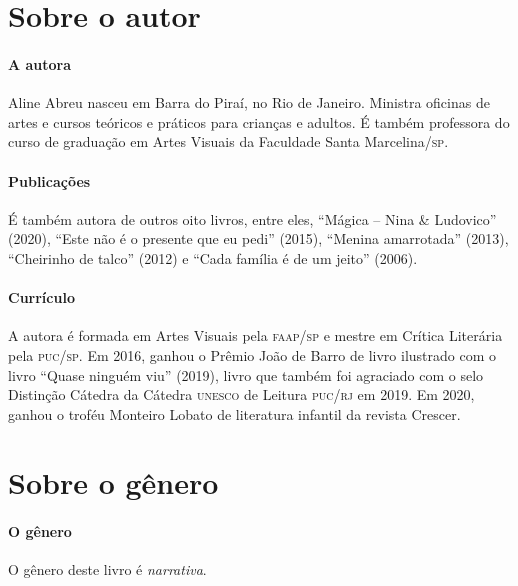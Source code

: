 \documentclass[11pt]{extarticle}
\begin{document}
\section{Sobre o autor}

\paragraph{A autora} 
Aline Abreu nasceu em Barra do Piraí, no Rio de Janeiro. Ministra oficinas de artes e cursos teóricos e práticos para crianças e adultos. É também professora do curso de graduação em Artes Visuais da Faculdade Santa Marcelina/\textsc{sp}.

\paragraph{Publicações} 
É também autora de outros oito livros, entre eles, ``Mágica – Nina \& Ludovico'' (2020), ``Este não é o presente que eu pedi'' (2015), ``Menina amarrotada'' (2013), ``Cheirinho de talco'' (2012) e ``Cada família é de um jeito'' (2006).

\paragraph{Currículo} 
A autora é formada em Artes Visuais pela \textsc{faap/sp} e mestre em Crítica Literária pela \textsc{puc/sp}. 
Em 2016, ganhou o Prêmio João de Barro de livro ilustrado com o livro ``Quase ninguém viu'' (2019), livro que também foi agraciado com o selo Distinção Cátedra da Cátedra \textsc{unesco} de Leitura \textsc{puc/rj} em 2019. Em 2020, ganhou o troféu Monteiro Lobato de literatura infantil da revista Crescer.


\section{Sobre o gênero}

\paragraph{O gênero} O gênero deste livro é \textit{narrativa}. 

\end{document}

